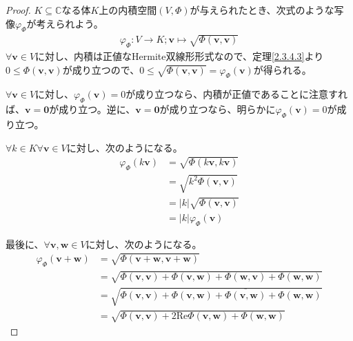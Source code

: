 \documentclass[dvipdfmx]{jsarticle}
\begin{document}
\begin{proof}
$K \subseteq \mathbb{C}$なる体$K$上の内積空間$(V,\varPhi)$が与えられたとき、次式のような写像$\varphi_{\varPhi}$が考えられよう。
\begin{align*}
\varphi_{\varPhi}:V \rightarrow K;\mathbf{v} \mapsto \sqrt{\varPhi\left( \mathbf{v},\mathbf{v} \right)}
\end{align*}
$\forall\mathbf{v} \in V$に対し、内積は正値なHermite双線形形式なので、定理\ref{2.3.4.3}より$0 \leq \varPhi\left( \mathbf{v},\mathbf{v} \right)$が成り立つので、$0 \leq \sqrt{\varPhi\left( \mathbf{v},\mathbf{v} \right)} = \varphi_{\varPhi}\left( \mathbf{v} \right)$が得られる。\par
$\forall\mathbf{v} \in V$に対し、$\varphi_{\varPhi}\left( \mathbf{v} \right) = 0$が成り立つなら、内積が正値であることに注意すれば、$\mathbf{v} = \mathbf{0}$が成り立つ。逆に、$\mathbf{v} = \mathbf{0}$が成り立つなら、明らかに$\varphi_{\varPhi}\left( \mathbf{v} \right) = 0$が成り立つ。\par
$\forall k \in K\forall\mathbf{v} \in V$に対し、次のようになる。
\begin{align*}
\varphi_{\varPhi}\left( k\mathbf{v} \right) &= \sqrt{\varPhi\left( k\mathbf{v},k\mathbf{v} \right)}\\
&= \sqrt{k^{2}\varPhi\left( \mathbf{v},\mathbf{v} \right)}\\
&= |k|\sqrt{\varPhi\left( \mathbf{v},\mathbf{v} \right)}\\
&= |k|\varphi_{\varPhi}\left( \mathbf{v} \right)
\end{align*}\par
最後に、$\forall\mathbf{v},\mathbf{w} \in V$に対し、次のようになる。
\begin{align*}
\varphi_{\varPhi}\left( \mathbf{v} + \mathbf{w} \right) &= \sqrt{\varPhi\left( \mathbf{v} + \mathbf{w},\mathbf{v} + \mathbf{w} \right)}\\
&= \sqrt{\varPhi\left( \mathbf{v},\mathbf{v} \right) + \varPhi\left( \mathbf{v},\mathbf{w} \right) + \varPhi\left( \mathbf{w},\mathbf{v} \right) + \varPhi\left( \mathbf{w},\mathbf{w} \right)}\\
&= \sqrt{\varPhi\left( \mathbf{v},\mathbf{v} \right) + \varPhi\left( \mathbf{v},\mathbf{w} \right) + \overline{\varPhi\left( \mathbf{v},\mathbf{w} \right)} + \varPhi\left( \mathbf{w},\mathbf{w} \right)}\\
&= \sqrt{\varPhi\left( \mathbf{v},\mathbf{v} \right) + 2\mathrm{Re}{\varPhi\left( \mathbf{v},\mathbf{w} \right)} + \varPhi\left( \mathbf{w},\mathbf{w} \right)}
\end{align*}

\end{proof}
\end{document}
